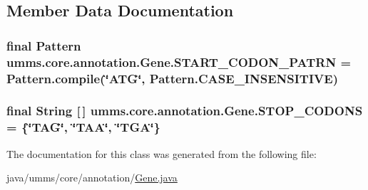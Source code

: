 \subsection{Member Data Documentation}
\hypertarget{classumms_1_1core_1_1annotation_1_1_gene_a40234c09d1097c20589ddc5c90b0945d}{
\subsubsection[{S\+T\+A\+R\+T\+\_\+\+C\+O\+D\+O\+N\+\_\+\+P\+A\+T\+R\+N}]{\setlength{\rightskip}{0pt plus 5cm}final Pattern umms.\+core.\+annotation.\+Gene.\+S\+T\+A\+R\+T\+\_\+\+C\+O\+D\+O\+N\+\_\+\+P\+A\+T\+R\+N = Pattern.\+compile(\char`\"{}A\+T\+G\char`\"{}, Pattern.\+C\+A\+S\+E\+\_\+\+I\+N\+S\+E\+N\+S\+I\+T\+I\+V\+E)\hspace{0.3cm}{\ttfamily [static]}}}\label{classumms_1_1core_1_1annotation_1_1_gene_a40234c09d1097c20589ddc5c90b0945d}
\hypertarget{classumms_1_1core_1_1annotation_1_1_gene_a4f6beedb7f869c3aac74594c74463f3c}{
\subsubsection[{S\+T\+O\+P\+\_\+\+C\+O\+D\+O\+N\+S}]{\setlength{\rightskip}{0pt plus 5cm}final String \mbox{[}$\,$\mbox{]} umms.\+core.\+annotation.\+Gene.\+S\+T\+O\+P\+\_\+\+C\+O\+D\+O\+N\+S = \{\char`\"{}T\+A\+G\char`\"{}, \char`\"{}T\+A\+A\char`\"{}, \char`\"{}T\+G\+A\char`\"{}\}\hspace{0.3cm}{\ttfamily [static]}}}\label{classumms_1_1core_1_1annotation_1_1_gene_a4f6beedb7f869c3aac74594c74463f3c}


The documentation for this class was generated from the following file\+:\begin{DoxyCompactItemize}
\item 
java/umms/core/annotation/\hyperlink{_gene_8java}{Gene.\+java}\end{DoxyCompactItemize}
